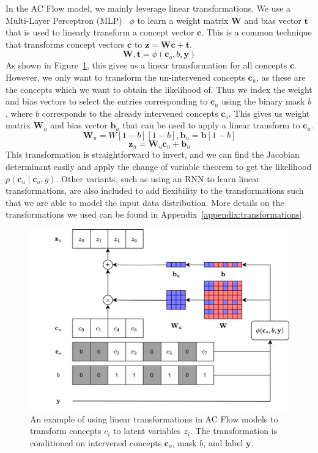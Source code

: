 In the AC Flow model, we mainly leverage
linear transformations. We use a Multi-Layer Perceptron (MLP)~\cite{feedforward} 
$\phi$ to learn 
a weight matrix $\mathbf{W}$ and bias vector $\mathbf{t}$ that is used to linearly transform a concept vector $\mathbf{c}$. This is a common
technique that transforms concept vectors $\mathbf{c}$ to $\mathbf{z} =\mathbf{W}\mathbf{c} + \mathbf{t}$.
\[\mathbf{W}, \mathbf{t} = \phi(\mathbf{c}_o, b, \mathbf{y})\]
As shown in Figure~\ref{fig:linear-transformation},
this gives us a linear transformation for all concepts $\mathbf{c}$.
However, we only want to transform the un-intervened concepts $\mathbf{c}_u$, as these
are the concepts which we want to obtain the likelihood of. Thus we index the weight and bias vectors to select the entries corresponding to $\mathbf{c}_u$ using the binary mask $b$, where $b$
corresponds to the already intervened concepts $\mathbf{c}_o$. This gives us weight matrix $\mathbf{W}_u$ and bias vector $\mathbf{b}_u$ that can be used to apply a linear transform to $\mathbf{c}_u$.
\[\mathbf{W}_{u} = W[1-b][1-b], \mathbf{b}_{u} = \mathbf{b}[1-b]\]
\[\mathbf{z}_u = \mathbf{W}_{u}\mathbf{c}_u + \mathbf{b}_{u}\]
 This transformation is 
straightforward to invert, and we can find the Jacobian determinant easily and apply the change of variable
theorem to get the likelihood $p(\mathbf{c}_u \mid \mathbf{c}_o, y)$.
Other variants, such as using an RNN to learn linear transformations, are also included to add flexibility to the transformations such that
we are able to model the input data distribution. More details on the transformations
we used can be found in Appendix~\ref{appendix:transformations}.

\begin{figure}[!ht]
    \centering
    \includegraphics[width=\textwidth]{figs/method/transformations.png}
    \caption{An example of using linear transformations
    in AC Flow models to transform concepts $c_i$ to latent variables $z_i$. The transformation is conditioned on intervened concepts $\mathbf{c}_o$, mask $b$, and label $\mathbf{y}.$}
    \label{fig:linear-transformation}
\end{figure}

